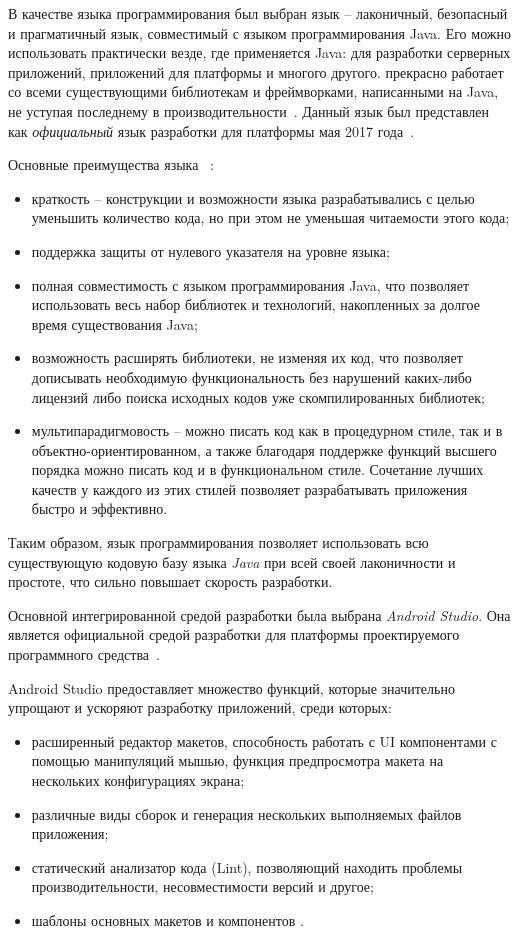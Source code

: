 В качестве языка программирования был выбран язык \emph{\kt} -- лаконичный, безопасный и прагматичный язык, совместимый с языком программирования Java.
Его можно использовать практически везде, где применяется Java: для разработки серверных приложений, приложений для платформы \andro и многого другого.
\kt прекрасно работает со всеми существующими библиотекам и фреймворками, написанными на Java, не уступая последнему в производительности~\cite{kotlin_in_action}.
Данный язык был представлен как \emph{официальный} язык разработки для платформы  мая 2017 года~\cite{kotlin_and_android}.

Основные преимущества языка \kt~\cite{kotlin_doc}:
\begin{itemize}
  \item краткость -- конструкции и возможности языка разрабатывались с целью уменьшить 
  количество кода, но при этом не уменьшая читаемости этого кода;
  \item поддержка защиты от нулевого указателя на уровне языка;
  \item полная совместимость с языком программирования Java, что позволяет использовать
  весь набор библиотек и технологий, накопленных за долгое время существования Java;
  \item возможность расширять библиотеки, не изменяя их код, что позволяет дописывать необходимую 
  функциональность без нарушений каких-либо лицензий либо поиска исходных кодов уже 
  скомпилированных библиотек;
  \item мультипарадигмовость -- \kt можно писать код как в процедурном стиле, так и в 
  объектно-ориентированном, а также благодаря поддержке функций высшего порядка можно 
  писать код и в функциональном стиле. Сочетание лучших качеств у каждого из этих стилей 
  позволяет разрабатывать приложения быстро и эффективно.
\end{itemize}

Таким образом, язык программирования \kt позволяет использовать всю существующую кодовую базу языка \emph{Java} при всей своей лаконичности и простоте, что сильно повышает скорость разработки.

Основной интегрированной средой разработки была выбрана \emph{Android Studio}. Она является официальной средой разработки для платформы проектируемого программного средства~\cite{android_studio}. 

Android Studio предоставляет множество функций, которые значительно упрощают и ускоряют разработку приложений, среди которых:
\begin{itemize}
    \item расширенный редактор макетов, способность работать с UI компонентами с помощью манипуляций мышью, функция предпросмотра макета на нескольких конфигурациях экрана;
    \item различные виды сборок и генерация нескольких выполняемых файлов приложения;
    \item статический анализатор кода (Lint), позволяющий находить проблемы производительности, несовместимости версий и другое;
    \item шаблоны основных макетов и компонентов \andro.
\end{itemize}